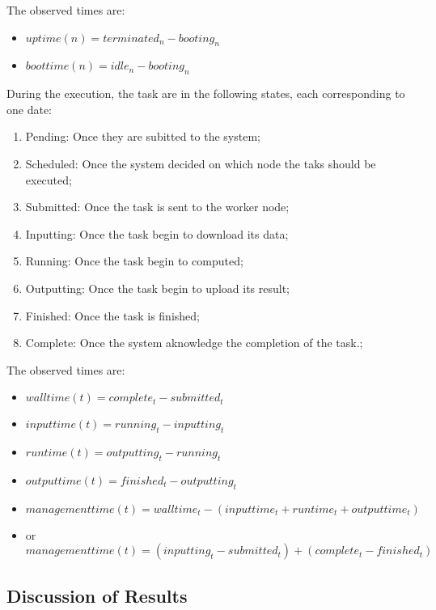 The observed times are:
\begin{itemize}
 \item $uptime(n) = terminated_n - booting_n$ 
 \item $boottime(n) = idle_n - booting_n$ 
\end{itemize}


During the execution, the task are in the following states, each corresponding to one date:
\begin{enumerate}
 \item Pending: Once they are subitted to the system;
 \item Scheduled: Once the system decided on which node the taks should be executed;
 \item Submitted: Once the task is sent to the worker node;
 \item Inputting: Once the task begin to download its data;
 \item Running: Once the task begin to computed;
 \item Outputting: Once the task begin to upload its result;
 \item Finished: Once the task is finished;
 \item Complete: Once the system aknowledge the completion of the task.;
\end{enumerate}

The observed times are:
\begin{itemize}
 \item $walltime(t) = complete_t - submitted_t$ 
 \item $inputtime(t) = running_t - inputting_t$
 \item $runtime(t) = outputting_t - running_t$
 \item $outputtime(t) = finished_t - outputting_t$
 \item $managementtime(t) = walltime_t - (inputtime_t+runtime_t+outputtime_t)$
 \item or $managementtime(t) = (inputting_t - submitted_t) + (complete_t - finished_t)$
\end{itemize}



\subsection{Discussion of Results}

